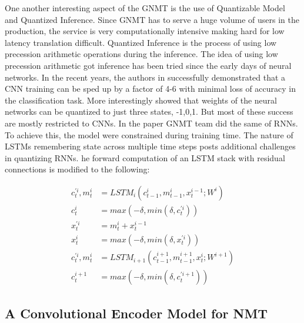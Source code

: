 \documentclass[a4paper]{article}
\begin{document}
One another interesting aspect  of the GNMT is the use of Quantizable  Model and
Quantized  Inference.  Since  GNMT  has to serve a huge volume  of users  in the
production, the  service is very computationally intensive making  hard  for low
latency translation difficult. Quantized Inference  is the process  of using low
precession arithmetic  operations during the  inference.  The idea of  using low
precession arithmetic  got inference has been  tried  since  the  early days  of
neural networks.  In the  recent  years, the authors  in  \cite{wu2016quantized}
successfully demonstrated that a CNN training can be sped up by a factor of  4-6
with  minimal  loss of  accuracy in the classification  task. More interestingly
\cite{li2016ternary} showed that weights of the neural networks can be quantized
to just three states, -1,0,1. But most of these success are mostly restricted to
CNNs.  In the paper GNMT team did  the same  of RNNs. To achieve this, the model
were constrained  during training time. The nature of  LSTMs  remembering  state
across multiple time  steps posts additional challenges  in  quantizing RNNs. he
forward  computation of  an LSTM stack with residual connections is modified  to
the following:


\begin{equation}
\begin{split}
c^{'i}_t,m^i_t & = LSTM_i(c^{i}_{t-1},m^i_{t-1}, x^{i-1}_t; W^i ) \\
c^{i}_t & =  max(-\delta, min(\delta,c^{'i}_t )) \\
x^{'i}_t & = m^{i}_t + x^{i-1}_t \\
x^{i}_t	& =  max(-\delta, min(\delta,x^{'i}_t )) \\
c^{'i}_t,m^i_t & = LSTM_{i+1}(c^{i+1}_{t-1},m^{i+1}_{t-1}, x^{i}_t; W^{i+1} ) \\
c^{i+1}_t & =  max(-\delta, min(\delta,c^{'i+1}_t ))
\end{split}
\end{equation}


\subsection{A Convolutional Encoder Model for NMT}
\end{document}
